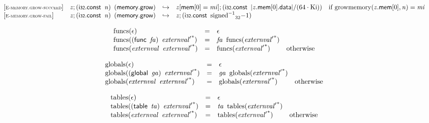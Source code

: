 \vspace{1ex}

$$
\begin{array}{@{}l@{}lcl@{}l@{}}
{[\textsc{\scriptsize E{-}memory.grow{-}succeed}]} \quad & {\mathit{z}} ; (\mathsf{i{\scriptstyle32}}.\mathsf{const}~\,{\mathit{n}})~\,(\mathsf{memory.grow}) &\hookrightarrow& {\mathit{z}}{}[\mathsf{mem}{}[0] = {\mathit{mi}}] ; (\mathsf{i{\scriptstyle32}}.\mathsf{const}~\,{|{{\mathit{z}}.\mathsf{mem}}{{}[0]}.\mathsf{data}|} / (64 \cdot {\mathrm{Ki}})) &\quad
  \mbox{if}~{\mathrm{growmemory}}({{\mathit{z}}.\mathsf{mem}}{{}[0]}, {\mathit{n}}) = {\mathit{mi}} \\
{[\textsc{\scriptsize E{-}memory.grow{-}fail}]} \quad & {\mathit{z}} ; (\mathsf{i{\scriptstyle32}}.\mathsf{const}~\,{\mathit{n}})~\,(\mathsf{memory.grow}) &\hookrightarrow& {\mathit{z}} ; (\mathsf{i{\scriptstyle32}}.\mathsf{const}~\,{{{{{\mathrm{signed}}^{{-1}}}}{}}_{32}}{{-1}}) &  \\
\end{array}
$$

$$
\begin{array}{@{}lcl@{}l@{}}
{\mathrm{funcs}}(\epsilon) &=& \epsilon &  \\
{\mathrm{funcs}}((\mathsf{func}~\,{\mathit{fa}})~\,{{\mathit{externval}'}^\ast}) &=& {\mathit{fa}}~\,{\mathrm{funcs}}({{\mathit{externval}'}^\ast}) &  \\
{\mathrm{funcs}}({\mathit{externval}}~\,{{\mathit{externval}'}^\ast}) &=& {\mathrm{funcs}}({{\mathit{externval}'}^\ast}) &\quad
  \mbox{otherwise} \\
\end{array}
$$

$$
\begin{array}{@{}lcl@{}l@{}}
{\mathrm{globals}}(\epsilon) &=& \epsilon &  \\
{\mathrm{globals}}((\mathsf{global}~\,{\mathit{ga}})~\,{{\mathit{externval}'}^\ast}) &=& {\mathit{ga}}~\,{\mathrm{globals}}({{\mathit{externval}'}^\ast}) &  \\
{\mathrm{globals}}({\mathit{externval}}~\,{{\mathit{externval}'}^\ast}) &=& {\mathrm{globals}}({{\mathit{externval}'}^\ast}) &\quad
  \mbox{otherwise} \\
\end{array}
$$

$$
\begin{array}{@{}lcl@{}l@{}}
{\mathrm{tables}}(\epsilon) &=& \epsilon &  \\
{\mathrm{tables}}((\mathsf{table}~\,{\mathit{ta}})~\,{{\mathit{externval}'}^\ast}) &=& {\mathit{ta}}~\,{\mathrm{tables}}({{\mathit{externval}'}^\ast}) &  \\
{\mathrm{tables}}({\mathit{externval}}~\,{{\mathit{externval}'}^\ast}) &=& {\mathrm{tables}}({{\mathit{externval}'}^\ast}) &\quad
  \mbox{otherwise} \\
\end{array}
$$

